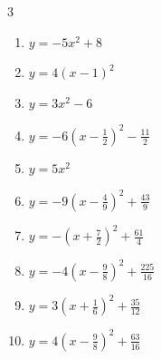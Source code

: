 \begin{multicols}{3}
\begin{enumerate}

\columnbreak %

  \item $\displaystyle y=-5x^{2}+8$

        \phantom{$\displaystyle 頂点\left( 0 , 8 \right)$}

  \item $\displaystyle y=4\left( x-1\right)^{2}$

        \phantom{$\displaystyle 頂点\left( 1 , 0 \right)$}

  \item $\displaystyle y=3x^{2}-6$

        \phantom{$\displaystyle 頂点\left( 0 , -6 \right)$}

  \item $\displaystyle y=-6\left( x-\frac{1}{2}\right)^{2}-\frac{11}{2}$


  \item $\displaystyle y=5x^{2}$

        \phantom{$\displaystyle 頂点\left( 0 , 0 \right)$}

  \item $\displaystyle y=-9\left( x-\frac{4}{9}\right)^{2}+\frac{43}{9}$


  \item $\displaystyle y=-\left( x+\frac{7}{2}\right)^{2}+\frac{61}{4}$


  \item $\displaystyle y=-4\left( x-\frac{9}{8}\right)^{2}+\frac{225}{16}$


  \item $\displaystyle y=3\left( x+\frac{1}{6}\right)^{2}+\frac{35}{12}$


  \item $\displaystyle y=4\left( x-\frac{9}{8}\right)^{2}+\frac{63}{16}$



\end{enumerate}
\end{multicols}
